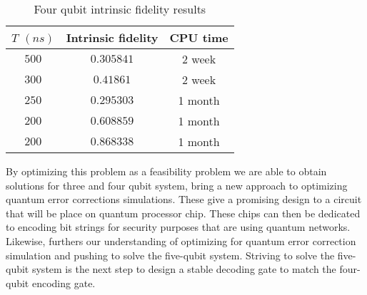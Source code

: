 \begin{table}[H]
    \caption{Four qubit intrinsic fidelity results}
    \centering
    \begin{tabular}{c|c|c}
    \hline  $T$ $(ns)$  & Intrinsic fidelity & CPU time \\
    \hline
    $500$  &$0.305841$ &2 week\\
    $300$  &$0.41861$  &2 week \\
    $250$  &$0.295303$ &1 month\\
    $200$  &$0.608859$ &1 month\\
    $200$  &$0.868338$ &1 month\\ \hline


    \end{tabular}
    \label{tab: 5 qubit results}
\end{table}

By optimizing this problem as a feasibility problem we are able to obtain solutions for three and four qubit system, bring a new approach to optimizing quantum error corrections simulations. These give a promising design to a circuit that will be place on quantum processor chip. These chips can then be dedicated to encoding bit strings for security purposes that are using quantum networks. Likewise, furthers our understanding of optimizing for quantum error correction simulation and pushing
to solve the five-qubit system. Striving to solve the five-qubit system is the next step to design a stable decoding gate to match the four-qubit encoding gate. 

